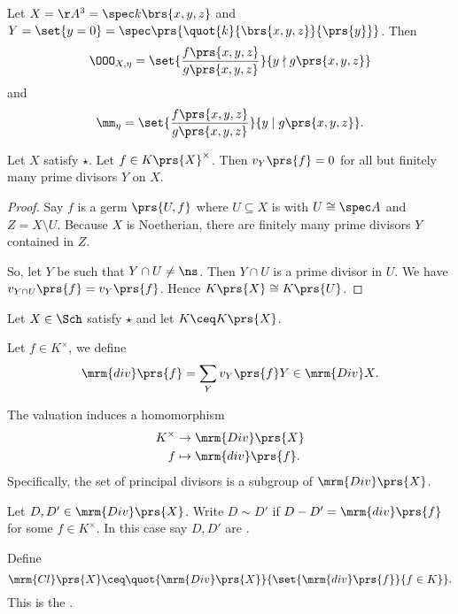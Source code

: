\documentclass[10pt,a4paper,twoside,openany,hidelinks]{book}
\begin{document}
\begin{example}
Let $X = \AA^3 = \spec k\brs{x,y,z}$ and $Y = \set{y = 0} = \spec \prs{\quot{k}{\brs{x,y,z}}{\prs{y}}}$.
Then
\[\OOO_{X,\eta} = \set{\frac{f\prs{x,y,z}}{g\prs{x,y,z}}}{y \nmid g\prs{x,y,z}}\]
and
\[\mm_\eta = \set{\frac{f\prs{x,y,z}}{g\prs{x,y,z}}}{y \mid g\prs{x,y,z}} \text{.}\]
\end{example}


\begin{lemma}
Let $X$ satisfy $\star$. Let $f \in K\prs{X}^\times$. Then $v_Y\prs{f} = 0$ for all but finitely many prime divisors $Y$ on $X$.
\end{lemma}

\begin{proof}
Say $f$ is a germ $\prs{U,f}$ where $U \subseteq X$ is with $U \cong \spec A$ and $Z = X \setminus U$. Because $X$ is Noetherian, there are finitely many prime divisors $Y$ contained in $Z$.

So, let $Y$ be such that $Y \cap U \neq \ns$. Then $Y \cap U$ is a prime divisor in $U$. We have $v_{Y \cap U}\prs{f} = v_Y\prs{f}$.
Hence $K\prs{X} \cong K\prs{U}$.

\end{proof}

Let $X \in \Sch$ satisfy $\star$ and let $K \ceq K\prs{X}$.

\begin{definition}
Let $f \in K^\times$, we define  \[\mrm{div}\prs{f} = \sum_Y v_Y\prs{f} Y \in \mrm{Div} X \text{.}\]
\end{definition}

\begin{remark}
The valuation induces a homomorphism
\begin{align*}
K^\times &\to \mrm{Div}\prs{X} \\
f &\mapsto \mrm{div}\prs{f} \text{.}
\end{align*}
Specifically, the set of principal divisors is a subgroup of $\mrm{Div}\prs{X}$.
\end{remark}

\begin{definition}
Let $D,D' \in \mrm{Div}\prs{X}$. Write $D \sim D'$ if $D - D' = \mrm{div}\prs{f}$for some $f \in K^\times$.
In this case say $D,D'$ are .
\end{definition}

\begin{definition}
Define \[\mrm{Cl}\prs{X} \ceq \quot{\mrm{Div}\prs{X}}{\set{\mrm{div}\prs{f}}{f \in K}} \text{.}\]
This is the .
\end{definition}
\end{document}
